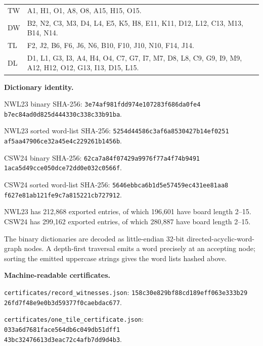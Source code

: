 \documentclass[letterpaper]{article}
\begin{document}
{\begin{tabular}{@{}lp{}@{}}
TW&A1, H1, O1, A8, O8, A15, H15, O15.\\
DW&B2, N2, C3, M3, D4, L4, E5, K5, H8, E11, K11, D12, L12, C13, M13, B14, N14.\\
TL&F2, J2, B6, F6, J6, N6, B10, F10, J10, N10, F14, J14.\\
DL&D1, L1, G3, I3, A4, H4, O4, C7, G7, I7, M7, D8, L8, C9, G9, I9, M9, A12, H12, O12, G13, I13, D15, L15.\\
\end{tabular}\par
\vspace{5pt}\textbf{Dictionary identity.}\par\vspace{2pt}
NWL23 binary SHA-256: \texttt{3e74af981fdd974e107283f686da0fe4}\\\texttt{b7ec84ad0d825d444330c338c33b91ba}.\par
NWL23 sorted word-list SHA-256: \texttt{5254d44586c3af6a8530427b14ef0251}\\\texttt{af5aa47906ce32a45e4c229261b1456b}.\par
CSW24 binary SHA-256: \texttt{62ca7a84f07429a9976f77a4f74b9491}\\\texttt{1aca5d49cce050dce72dd0e032c0566f}.\par
CSW24 sorted word-list SHA-256: \texttt{5646ebbca6b1d5e57459ec431ee81aa8}\\\texttt{f627e81ab121fe9c7a815221cb727912}.\par
NWL23 has 212,868 exported entries, of which 196,601 have board length 2--15. CSW24 has 299,162 exported entries, of which 280,887 have board length 2--15.\par
The binary dictionaries are decoded as little-endian 32-bit directed-acyclic-word-graph nodes. A depth-first traversal emits a word precisely at an accepting node; sorting the emitted uppercase strings gives the word lists hashed above.\par
\vspace{5pt}\textbf{Machine-readable certificates.}\par\vspace{2pt}
\texttt{certificates/record\_witnesses.json}: \texttt{158c30e829bf88cd189eff063e333b29}\\\texttt{26fd7f48e9e0b3d59377f0caebdac677}.\par
\texttt{certificates/one\_tile\_certificate.json}: \texttt{033a6d7681face564db6c049db51dff1}\\\texttt{43bc32476613d3eac72c4afb7dd9d4b3}.\par
}
\end{document}
